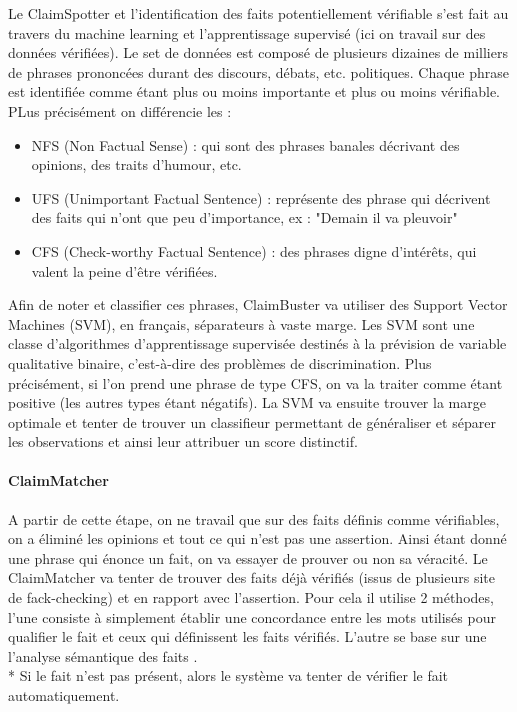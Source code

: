 \documentclass[12pt]{article}
\begin{document}
Le ClaimSpotter et l'identification des faits potentiellement vérifiable s'est fait au travers du machine learning et l'apprentissage supervisé (ici on travail sur des données vérifiées). Le set de données est composé de plusieurs dizaines de milliers de phrases prononcées durant des discours, débats, etc. politiques. Chaque phrase est identifiée comme étant plus ou moins importante et plus ou moins vérifiable. PLus précisément on différencie les : 
\begin{itemize}
    \item NFS (Non Factual Sense) : qui sont des phrases banales décrivant des opinions, des traits d'humour, etc. 
    \item UFS (Unimportant Factual Sentence) : représente des phrase qui décrivent des faits qui n'ont que peu d'importance, ex : "Demain il va pleuvoir"
    \item CFS (Check-worthy Factual Sentence) : des phrases digne d'intérêts, qui valent la peine d'être vérifiées. 
\end{itemize}

Afin de noter et classifier ces phrases, ClaimBuster va utiliser des Support Vector Machines (SVM), en français, séparateurs à vaste marge. Les SVM sont une classe d'algorithmes d'apprentissage supervisée destinés à la prévision de variable qualitative binaire, c'est-à-dire des problèmes de discrimination. Plus précisément, si l'on prend une phrase de type CFS, on va la traiter comme étant positive (les autres types étant négatifs). La SVM va ensuite trouver la marge optimale et tenter de trouver un classifieur permettant de généraliser et séparer les observations et ainsi leur attribuer un score distinctif.

\paragraph{ClaimMatcher}

A partir de cette étape, on ne travail que sur des faits définis comme vérifiables, on a éliminé les opinions et tout ce qui n'est pas une assertion. Ainsi étant donné une phrase qui énonce un fait, on va essayer de prouver ou non sa véracité. Le ClaimMatcher va tenter de trouver des faits déjà vérifiés (issus de plusieurs site de fack-checking) et en rapport avec l'assertion. Pour cela il utilise 2 méthodes, l'une consiste à simplement établir une concordance entre les mots utilisés pour qualifier le fait et ceux qui définissent les faits vérifiés. L'autre se base sur une l'analyse sémantique des faits \cite{rus2013semilar}. 
\\*
Si le fait n'est pas présent, alors le système va tenter de vérifier le fait automatiquement.
\end{document}
